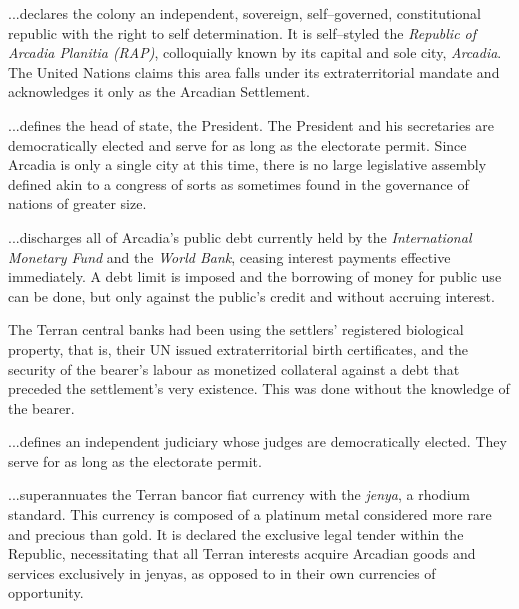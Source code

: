 
\startarticle
\item %

...declares the colony an independent, sovereign, self--governed, constitutional republic with the right to self determination. It is self--styled the {\it Republic of Arcadia Planitia (RAP)}, colloquially known by its capital and sole city, {\it Arcadia}. The United Nations claims this area falls under its extraterritorial mandate and acknowledges it only as the Arcadian Settlement.

\item %

...defines the head of state, the President. The President and his secretaries are democratically elected and serve for as long as the electorate permit. Since Arcadia is only a single city at this time, there is no large legislative assembly defined akin to a congress of sorts as sometimes found in the governance of nations of greater size.

\item %

...discharges all of Arcadia's public debt currently held by the {\it International Monetary Fund} and the {\it World Bank}, ceasing interest payments effective immediately. A debt limit is imposed and the borrowing of money for public use can be done, but only against the public's credit and without accruing interest.

The Terran central banks had been using the settlers' registered biological property, that is, their UN issued extraterritorial birth certificates, and the security of the bearer's labour as monetized collateral against a debt that preceded the settlement's very existence. This was done without the knowledge of the bearer.

\item %

...defines an independent judiciary whose judges are democratically elected. They serve for as long as the electorate permit.
\stoparticle

\startarticle[start=7]
\item %

...superannuates the Terran bancor fiat currency with the {\it jenya}, a rhodium standard. This currency is composed of a platinum metal considered more rare and precious than gold. It is declared the exclusive legal tender within the Republic, necessitating that all Terran interests acquire Arcadian goods and services exclusively in jenyas, as opposed to in their own currencies of opportunity.

